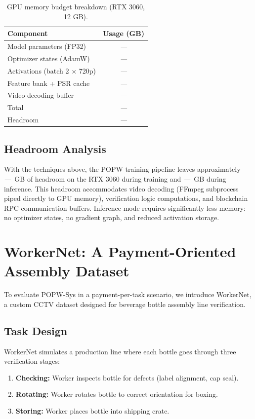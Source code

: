 \documentclass[10pt,twocolumn]{article}
\newcommand{\popw}{POPW}
\newcommand{\popwsys}{POPW-Sys}
\newcommand{\todo}{\textit{---}}
\newcommand{\popwres}{\todo}
\begin{document}
\begin{table}[htbp]
\centering
\small
\caption{GPU memory budget breakdown (RTX 3060, 12 GB).}
\label{tab:memory-budget}
\begin{tabular}{l c}
\toprule
\textbf{Component} & \textbf{Usage (GB)} \\
\midrule
Model parameters (FP32) & \popwres \\
Optimizer states (AdamW) & \popwres \\
Activations (batch 2 $\times$ 720p) & \popwres \\
Feature bank + PSR cache & \popwres \\
Video decoding buffer & \popwres \\
\midrule
Total & \popwres \\
Headroom & \popwres \\
\bottomrule
\end{tabular}
\end{table}

\subsection{Headroom Analysis}

With the techniques above, the \popw{} training pipeline leaves approximately \popwres~GB of headroom on the RTX 3060 during training and \popwres~GB during inference. This headroom accommodates video decoding (FFmpeg subprocess piped directly to GPU memory), verification logic computations, and blockchain RPC communication buffers. Inference mode requires significantly less memory: no optimizer states, no gradient graph, and reduced activation storage.

\FloatBarrier

\section{WorkerNet: A Payment-Oriented Assembly Dataset}
\label{sec:workernet}

To evaluate \popwsys{} in a payment-per-task scenario, we introduce WorkerNet, a custom CCTV dataset designed for beverage bottle assembly line verification.

\subsection{Task Design}

WorkerNet simulates a production line where each bottle goes through three verification stages:
\begin{enumerate}[nosep]
\item \textbf{Checking:} Worker inspects bottle for defects (label alignment, cap seal).
\item \textbf{Rotating:} Worker rotates bottle to correct orientation for boxing.
\item \textbf{Storing:} Worker places bottle into shipping crate.
\end{enumerate}
\end{document}
